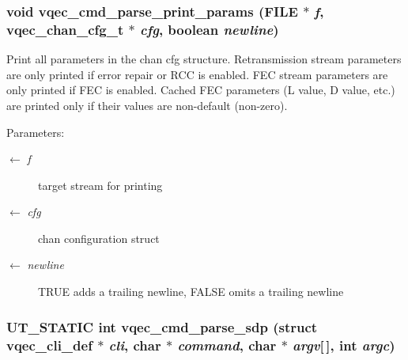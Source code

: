 \subsubsection{\setlength{\rightskip}{0pt plus 5cm}void vqec\_\-cmd\_\-parse\_\-print\_\-params (FILE $\ast$ {\em f}, \bf{vqec\_\-chan\_\-cfg\_\-t} $\ast$ {\em cfg}, boolean {\em newline})}\label{vqec__cli__register_8c_79f7a92991a72445d52dcb2760355312}


Print all parameters in the chan cfg structure. Retransmission stream parameters are only printed if error repair or RCC is enabled. FEC stream parameters are only printed if FEC is enabled. Cached FEC parameters (L value, D value, etc.) are printed only if their values are non-default (non-zero).

\begin{Desc}
\item[Parameters:]
\begin{description}
\item[\mbox{$\leftarrow$} {\em f}]target stream for printing \item[\mbox{$\leftarrow$} {\em cfg}]chan configuration struct \item[\mbox{$\leftarrow$} {\em newline}]TRUE adds a trailing newline, FALSE omits a trailing newline \end{description}
\end{Desc}
\subsubsection{\setlength{\rightskip}{0pt plus 5cm}UT\_\-STATIC int vqec\_\-cmd\_\-parse\_\-sdp (struct \bf{vqec\_\-cli\_\-def} $\ast$ {\em cli}, char $\ast$ {\em command}, char $\ast$ {\em argv}[$\,$], int {\em argc})}\label{vqec__cli__register_8c_afe1360f01411a6df3f4441835ed3da4}


